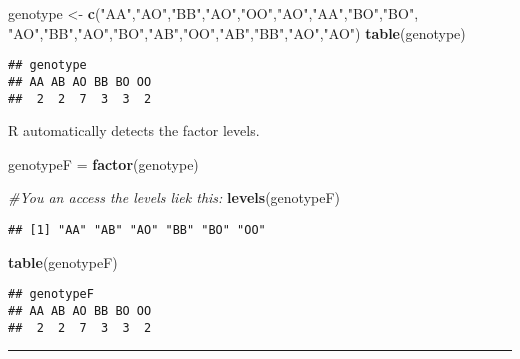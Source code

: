 \documentclass[]{article}
\newenvironment{Shaded}{\begin{snugshade}}{\end{snugshade}}
\newcommand{\KeywordTok}[1]{\textcolor[rgb]{0.13,0.29,0.53}{\textbf{#1}}}
\newcommand{\StringTok}[1]{\textcolor[rgb]{0.31,0.60,0.02}{#1}}
\newcommand{\CommentTok}[1]{\textcolor[rgb]{0.56,0.35,0.01}{\textit{#1}}}
\newcommand{\NormalTok}[1]{#1}
\let\oldrule=\rule
\renewcommand{\rule}[1]{\oldrule{\linewidth}}
\begin{document}
\begin{Shaded}
\begin{Highlighting}[]
\NormalTok{genotype <-}\StringTok{ }\KeywordTok{c}\NormalTok{(}\StringTok{"AA"}\NormalTok{,}\StringTok{"AO"}\NormalTok{,}\StringTok{"BB"}\NormalTok{,}\StringTok{"AO"}\NormalTok{,}\StringTok{"OO"}\NormalTok{,}\StringTok{"AO"}\NormalTok{,}\StringTok{"AA"}\NormalTok{,}\StringTok{"BO"}\NormalTok{,}\StringTok{"BO"}\NormalTok{,}
             \StringTok{"AO"}\NormalTok{,}\StringTok{"BB"}\NormalTok{,}\StringTok{"AO"}\NormalTok{,}\StringTok{"BO"}\NormalTok{,}\StringTok{"AB"}\NormalTok{,}\StringTok{"OO"}\NormalTok{,}\StringTok{"AB"}\NormalTok{,}\StringTok{"BB"}\NormalTok{,}\StringTok{"AO"}\NormalTok{,}\StringTok{"AO"}\NormalTok{)}
\KeywordTok{table}\NormalTok{(genotype)}
\end{Highlighting}
\end{Shaded}

\begin{verbatim}
## genotype
## AA AB AO BB BO OO 
##  2  2  7  3  3  2
\end{verbatim}

R automatically detects the factor levels.

\begin{Shaded}
\begin{Highlighting}[]
\NormalTok{genotypeF =}\StringTok{ }\KeywordTok{factor}\NormalTok{(genotype)}

\CommentTok{#You an access the levels liek this:}
\KeywordTok{levels}\NormalTok{(genotypeF)}
\end{Highlighting}
\end{Shaded}

\begin{verbatim}
## [1] "AA" "AB" "AO" "BB" "BO" "OO"
\end{verbatim}

\begin{Shaded}
\begin{Highlighting}[]
\KeywordTok{table}\NormalTok{(genotypeF)}
\end{Highlighting}
\end{Shaded}

\begin{verbatim}
## genotypeF
## AA AB AO BB BO OO 
##  2  2  7  3  3  2
\end{verbatim}

\begin{center}\rule{0.5\linewidth}{\linethickness}\end{center}
\end{document}
